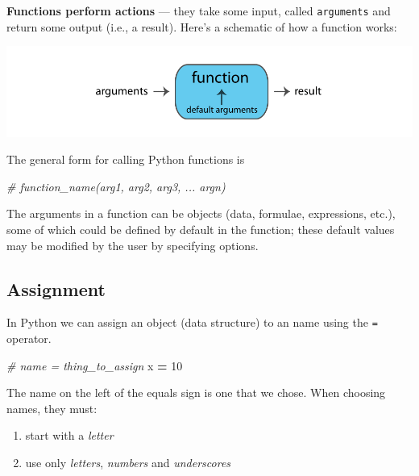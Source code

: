 \documentclass[
]{book}
\newenvironment{Shaded}{\begin{snugshade}}{\end{snugshade}}
\newcommand{\CommentTok}[1]{\textcolor[rgb]{0.56,0.35,0.01}{\textit{#1}}}
\newcommand{\DecValTok}[1]{\textcolor[rgb]{0.00,0.00,0.81}{#1}}
\newcommand{\NormalTok}[1]{#1}
\newcommand{\OperatorTok}[1]{\textcolor[rgb]{0.81,0.36,0.00}{\textbf{#1}}}
\providecommand{\tightlist}{%
  \setlength{\itemsep}{0pt}\setlength{\parskip}{0pt}}
\begin{document}
\textbf{Functions perform actions} --- they take some input, called \texttt{arguments} and return some
output (i.e., a result). Here's a schematic of how a function works:

\includegraphics{Python/PythonIntro/images/function.png}

The general form for calling Python functions is

\begin{Shaded}
\begin{Highlighting}[]
\CommentTok{\# function\_name(arg1, arg2, arg3, ... argn)}
\end{Highlighting}
\end{Shaded}

The arguments in a function can be objects (data, formulae, expressions, etc.),
some of which could be defined by default in the function; these default values may
be modified by the user by specifying options.

\hypertarget{assignment-1}{%
\subsection{Assignment}\label{assignment-1}}

In Python we can assign an object (data structure) to an name using the \texttt{=} operator.

\begin{Shaded}
\begin{Highlighting}[]
\CommentTok{\# name = thing\_to\_assign}
\NormalTok{x }\OperatorTok{=} \DecValTok{10}
\end{Highlighting}
\end{Shaded}

The name on the left of the equals sign is one that we chose. When choosing names, they must:

\begin{enumerate}
\def\labelenumi{\arabic{enumi}.}
\tightlist
\item
  start with a \emph{letter}
\item
  use only \emph{letters}, \emph{numbers} and \emph{underscores}
\end{enumerate}
\end{document}
